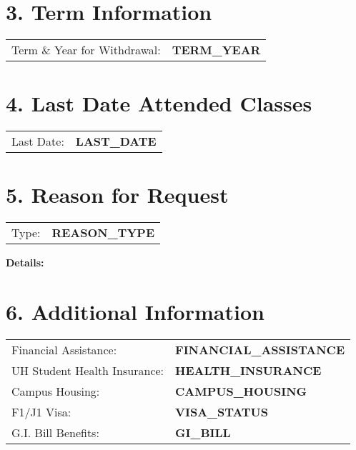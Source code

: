 \documentclass[12pt]{article}
\begin{document}
\vspace{0.5cm}

\section*{3. Term Information}
\begin{tabular}{ll}
Term \& Year for Withdrawal: & \textbf{TERM\_YEAR} \\
\end{tabular}

\vspace{0.5cm}

\section*{4. Last Date Attended Classes}
\begin{tabular}{ll}
Last Date: & \textbf{LAST\_DATE} \\
\end{tabular}

\vspace{0.5cm}

\section*{5. Reason for Request}
\begin{tabular}{ll}
Type: & \textbf{REASON\_TYPE} \\
\end{tabular}

\noindent\textbf{Details:}\\

\vspace{0.5cm}

\section*{6. Additional Information}
\begin{tabular}{ll}
Financial Assistance: & \textbf{FINANCIAL\_ASSISTANCE} \\
UH Student Health Insurance: & \textbf{HEALTH\_INSURANCE} \\
Campus Housing: & \textbf{CAMPUS\_HOUSING} \\
F1/J1 Visa: & \textbf{VISA\_STATUS} \\
G.I. Bill Benefits: & \textbf{GI\_BILL} \\
\end{tabular}
\end{document}
